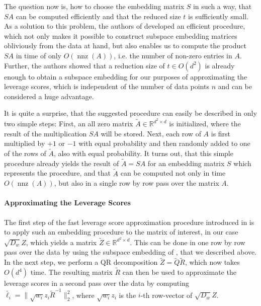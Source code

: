 The question now is, how to choose the embedding matrix $S$ in
such a way, that $SA$ can be
computed efficiently and that the reduced size $t$ is sufficiently
small. As a solution to this problem, the authors of
\cite{woodruff-2017} developed an efficient procedure,
which not only makes it possible to construct subspace
embedding matrices obliviously from the data at hand, but
also enables us to compute the product $SA$
in time of only $O(\operatorname{nnz}(A))$, i.e. the number of
non-zero entries in $A$.
Further, the authors showed that a reduction size of
$t \in O(d^2)$ is already enough to obtain a subspace embedding
for our purposes of approximating the leverage scores,
which is independent of the number of data points $n$ and
can be considered a huge advantage.

It is quite a surprise, that the suggested
procedure can easily be described in only two simple steps:
First, an all zero matrix
$\tilde{A} \in \mathbb{R}^{d^2 \times d}$ is initialized, where
the result of the multiplication $SA$ will be stored.
Next, each row of $A$ is first multiplied by $+1$ or $-1$
with equal probability and then randomly added to one of the
rows of $\tilde{A}$, also with equal probability.
It turns out, that this simple procedure already yields the
result of $\tilde{A} = SA$ for an embedding matrix $S$ which
represents the procedure, and that $\tilde{A}$ can be
computed not only in time $O(\operatorname{nnz}(A))$, but also
in a single row by row pass over the matrix $A$.

\paragraph{Approximating the Leverage Scores}

The first step of the fast leverage score approximation procedure
introduced in \cite{leverage-scores-drineas} is to apply such
an embedding procedure to the matrix of interest,
in our case $\sqrt{D_w}Z$, which yields
a matrix $\tilde{Z} \in \mathbb{R}^{d^2 \times d}$.
This can be done in one row by row pass over the data
by using the subspace embedding of
\cite{woodruff-2017}, that we described above.
In the next step, we perform a QR decomposition
$\tilde{Z} = \tilde{Q} \tilde{R}$, which now takes
$O(d^4)$ time. The resulting
matrix $\tilde{R}$ can then be used to approximate
the leverage scores in a second pass over the data by computing
$\tilde{\ell_i} = \lVert \sqrt{w_i} z_i \tilde{R}^{-1} \rVert_2^2$,
where $\sqrt{w_i} z_i$ is the $i$-th row-vector of
$\sqrt{D_w}Z$.

